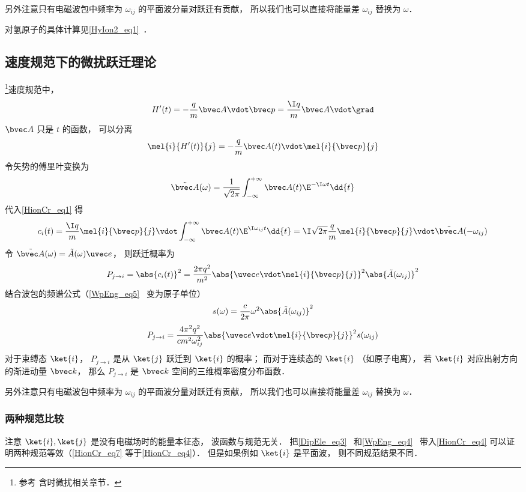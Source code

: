 另外注意只有电磁波包中频率为 $\omega_{ij}$ 的平面波分量对跃迁有贡献， 所以我们也可以直接将能量差 $\omega_{ij}$ 替换为 $\omega$．

对氢原子的具体计算见\autoref{HyIon2_eq1}~．

\subsection{速度规范下的微扰跃迁理论}
\footnote{参考\cite{Merzbacher} 含时微扰相关章节．}速度规范中，
\begin{equation}
H'(t) = -\frac{q}{m}\bvec A \vdot \bvec p = \frac{\I q}{m}\bvec A \vdot \grad
\end{equation}
$\bvec A$ 只是 $t$ 的函数， 可以分离
\begin{equation}
\mel{i}{H'(t)}{j} = -\frac{q}{m}\bvec A(t) \vdot \mel{i}{\bvec p}{j}
\end{equation}
令矢势的傅里叶变换为
\begin{equation}
\tilde {\bvec A}(\omega) = \frac{1}{\sqrt{2\pi}} \int_{-\infty}^{+\infty} \bvec A(t) \E^{-\I\omega t} \dd{t}
\end{equation}
代入\autoref{HionCr_eq1} 得
\begin{equation}\label{HionCr_eq4}
c_i(t) = \frac{\I q}{m} \mel{i}{\bvec p}{j} \vdot \int_{-\infty}^{+\infty}  \bvec A(t) \E^{\I\omega_{ij} t} \dd{t} = \I\sqrt{2\pi}\frac{q}{m} \mel{i}{\bvec p}{j} \vdot \tilde {\bvec A}(-\omega_{ij})
\end{equation}
令 $\tilde {\bvec A}(\omega) = \tilde {A}(\omega)\uvec e$， 则跃迁概率为
\begin{equation}\label{HionCr_eq3}
P_{j\to i} = \abs{c_i(t)}^2 = \frac{2\pi q^2}{m^2} \abs{\uvec e \vdot\mel{i}{\bvec p}{j}}^2 \abs{\tilde {A}(\omega_{ij})}^2
\end{equation}
结合波包的频谱公式（\autoref{WpEng_eq5}~ 变为原子单位）
\begin{equation}
s(\omega) = \frac{c}{2\pi} \omega^2 \abs{\tilde {A}(\omega_{ij})}^2
\end{equation}
\begin{equation}\label{HionCr_eq5}
P_{j\to i} = \frac{4\pi^2 q^2}{c m^2 \omega_{ij}^2} \abs{\uvec e \vdot\mel{i}{\bvec p}{j}}^2 s(\omega_{ij})
\end{equation}
对于束缚态 $\ket{i}$， $P_{j\to i}$ 是从 $\ket{j}$ 跃迁到 $\ket{i}$ 的概率； 而对于连续态的 $\ket{i}$ （如原子电离）， 若 $\ket{i}$ 对应出射方向的渐进动量 $\bvec k$， 那么 $P_{j\to i}$ 是 $\bvec k$ 空间的三维概率密度分布函数．

另外注意只有电磁波包中频率为 $\omega_{ij}$ 的平面波分量对跃迁有贡献， 所以我们也可以直接将能量差 $\omega_{ij}$ 替换为 $\omega$．

\subsubsection{两种规范比较}
注意 $\ket{i}, \ket{j}$ 是没有电磁场时的能量本征态， 波函数与规范无关． 把\autoref{DipEle_eq3}~ 和\autoref{WpEng_eq4}~ 带入\autoref{HionCr_eq4} 可以证明两种规范等效（\autoref{HionCr_eq7}  等于\autoref{HionCr_eq4}）． 但是如果例如 $\ket{i}$ 是平面波， 则不同规范结果不同．
